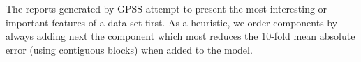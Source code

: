 \documentclass{article}
\def\ie{i.e.\ }
\def\eg{e.g.\ }
\begin{document}
The reports generated by GPSS attempt to present the most interesting or important features of a data set first.
As a heuristic, we order components by always adding next the component which most reduces the 10-fold mean absolute error (using contiguous blocks) when added to the model.








\end{document}
